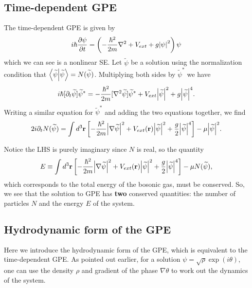 \documentclass{book}
\theoremstyle{definition}
\newcommand{\p}{\partial}
\newcommand{\f}[2]{\frac{#1}{#2}}
\newcommand{\lp}{\left(}
\newcommand{\rp}{\right)}
\newcommand{\lb}{\left[}
\newcommand{\rb}{\right]}
\begin{document}
\subsection*{Time-dependent GPE}

The time-dependent GPE is given by 
\begin{equation*}
i\hbar \f{\p\psi}{\p t} = \lp -\f{\hbar^2}{2m} \nabla^2 + V_{ext} + g\abs{\psi}^2 \rp \psi
\end{equation*}
which we can see is a nonlinear SE. Let $\widetilde{\psi}$ be a solution using the normalization condition that $\braket{\widetilde{\psi}} = N(\widetilde{\psi})$. Multiplying both sides by $\widetilde{\psi}^*$ we have
\begin{equation*}
i\hbar [\p_t \widetilde{\psi}] \widetilde{\psi}^* = -\f{\hbar^2}{2m} [\nabla^2 \widetilde{\psi} ] \widetilde{\psi}^* + V_{ext} \abs{\widetilde{\psi}}^2 + g \abs{\widetilde{\psi}}^4.
\end{equation*}
Writing a similar equation for $\widetilde{\psi}^*$ and adding the two equations together, we find 
\begin{equation*}
2i\p_t N(\widetilde{\psi}) = \int d^3 \mathbf{r} \lb -\f{\hbar^2}{2m} \abs{\nabla \widetilde{\psi}}^2 + V_{ext}(\mathbf{r}) \abs{\widetilde{\psi}}^2 + \f{g}{2} \abs{\widetilde{\psi}}^4 \rb - \mu \abs{\widetilde{\psi}}^2.
\end{equation*}

Notice the LHS is purely imaginary since $N$ is real, so the quantity
\begin{equation*}
E \equiv \int d^3 \mathbf{r} \lb -\f{\hbar^2}{2m} \abs{\nabla \widetilde{\psi}}^2 + V_{ext}(\mathbf{r}) \abs{\widetilde{\psi}}^2 + \f{g}{2} \abs{\widetilde{\psi}}^4 \rb - \mu N(\widetilde{\psi}),
\end{equation*}
which corresponds to the total energy of the bosonic gas, must be conserved. So, we see that the solution to GPE has \textbf{two} conserved quantities: the number of particles $N$ and the energy $E$ of the system. 


\subsection*{Hydrodynamic form of the GPE}

Here we introduce the hydrodynamic form of the GPE, which is equivalent to the time-dependent GPE. As pointed out earlier, for a solution $\psi = \sqrt{\rho} \exp(i\theta)$, one can use the density $\rho$ and gradient of the phase $\nabla \theta$ to work out the dynamics of the system.\\
\end{document}
